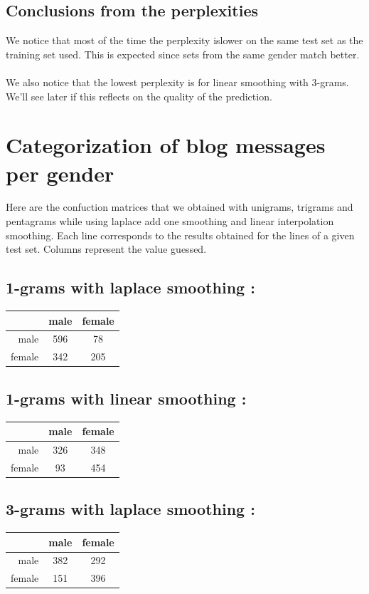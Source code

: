 \documentclass{eplDoc}
\begin{document}
\subsection{Conclusions from the perplexities}

We notice that most of the time the perplexity islower on the same test set as the training set used. This is expected since sets from the same gender match better. \\ \\ 
We also notice that the lowest perplexity is for linear smoothing with 3-grams. We'll see later if this reflects on the quality of the prediction.

\section{Categorization of blog messages per gender}

Here are the confuction matrices that we obtained with unigrams, trigrams and pentagrams while using laplace add one smoothing and linear interpolation smoothing. Each line corresponds to the results obtained for the lines of a given test set. Columns represent the value guessed. 
\subsection{1-grams with laplace smoothing :} 
\begin{tabular}{|r|c|c|} 
\hline 
 & male & female \\ 
\hline 
male & 596 & 78 \\ 
female & 342 & 205 \\ 
\hline 
\end{tabular} 
\subsection{1-grams with linear smoothing :} 
\begin{tabular}{|r|c|c|} 
\hline 
 & male & female \\ 
\hline 
male & 326 & 348 \\ 
female & 93 & 454 \\ 
\hline 
\end{tabular} 
\subsection{3-grams with laplace smoothing :} 
\begin{tabular}{|r|c|c|} 
\hline 
 & male & female \\ 
\hline 
male & 382 & 292 \\ 
female & 151 & 396 \\ 
\hline 
\end{tabular} 
\end{document}
